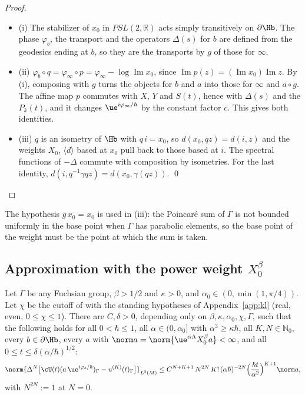 \begin{proof}
\begin{itemize}
\item (i) The stabilizer of $x_0$ in $PSL(2,\mathbb R)$ acts simply transitively on $\partial\Hb$. The phase $\varphi_b$, the transport and
the operators $\Delta(s)$ for $b$ are defined from the geodesics ending at $b$, so they are the transports by $g$ of those for $\infty$.
\item (ii) $\varphi_b\circ q=\varphi_\infty\circ p=\varphi_\infty-\log\operatorname{Im}x_0$, since $\operatorname{Im}p(z)=(\operatorname{Im}x_0)\operatorname{Im}z$.
By (i), composing with $g$ turns the objects for $b$ and $a$ into those for $\infty$ and $a\circ g$. The affine map $p$ commutes with
$X$, $Y$ and $S(t)$, hence with $\Delta(s)$ and the $P_k(t)$, and it changes $\ue^{i\varphi_\infty/\hbar}$ by the constant factor $c$. This
gives both identities.
\item (iii) $q$ is an isometry of $\Hb$ with $q\,i=x_0$, so $d(x_0,qz)=d(i,z)$ and the weights $X_0$, $\langle d\rangle$ based at $x_0$ pull
back to those based at $i$. The spectral functions of $-\Delta$ commute with composition by isometries. For the last identity,
$d(i,q^{-1}\gamma qz)=d(x_0,\gamma(qz))$. \qed
\end{itemize}
\end{proof}

\begin{remark}
The hypothesis $g\,x_0=x_0$ is used in (iii): the Poincar\'e sum of $\Gamma$ is not bounded uniformly in the base point when $\Gamma$
has parabolic elements, so the base point of the weight must be the point at which the sum is taken.
\end{remark}

\subsection{Approximation with the power weight \texorpdfstring{$X_0^\beta$}{X0}}\label{subsec:dd-thm}

\begin{theorem}\label{thm:dd-appx}
Let $\Gamma$ be any Fuchsian group, $\beta>1/2$ and $\kappa>0$, and $\alpha_0\in(0,\min(1,\pi/4))$. Let $\chi$ be the cutoff of \cite[(4.20)]{S} with the standing hypotheses of Appendix~\ref{app:kl} (real, even, $0\le\chi\le1$).
There are $C,\delta>0$, depending only on $\beta,\kappa,\alpha_0,\chi,\Gamma$, such that the following holds for all $0<\hbar\le1$, all $\alpha\in(0,\alpha_0]$ with $\alpha^3\ge\kappa\hbar$, all $K,N\in\mathbb N_0$, every $b\in\partial\Hb$, every $a$ with $\norm a=\norm{\ue^{\alpha\Lambda}X_0^\beta a}<\infty$, and all $0\le t\le\delta(\alpha/\hbar)^{1/2}$:
\[
\norm{\Delta^N\bigl[\cU(t)(a\,\ue^{i\varphi_b/\hbar})_\Gamma-u^{(K)}(t)_\Gamma\bigr]}_{L^2(M)}\le C^{N+K+1}\,N^{2N}\,K!\,(\alpha\hbar)^{-2N}\Bigl(\frac{\hbar t}{\alpha^2}\Bigr)^{K+1}\norm a,
\]
with $N^{2N}:=1$ at $N=0$.
\end{theorem}


